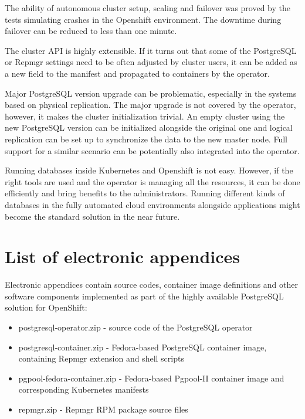 \documentclass[
  digital, %
  twoside, %
  table,   %
  lof,     %
  lot,     %
]{fithesis3}
\begin{document}
The ability of autonomous cluster setup, scaling and failover was proved by the tests simulating crashes in the Openshift environment. The downtime during failover can be reduced to less than one minute.

The cluster API is highly extensible. If it turns out that some of the PostgreSQL or Repmgr settings need to be often adjusted by cluster users, it can be added as a new field to the manifest and propagated to containers by the operator.

Major PostgreSQL version upgrade can be problematic, especially in the systems based on physical replication. The major upgrade is not covered by the operator, however, it makes the cluster initialization trivial. An empty cluster using the new PostgreSQL version can be initialized alongside the original one and logical replication can be set up to synchronize the data to the new master node. Full support for a similar scenario can be potentially also integrated into the operator.

Running databases inside Kubernetes and Openshift is not easy. However, if the right tools are used and the operator is managing all the resources, it can be done efficiently and bring benefits to the administrators. Running different kinds of databases in the fully automated cloud environments alongside applications might become the standard solution in the near future.


\appendix %
\chapter{List of electronic appendices} \label{chap:appendices}
Electronic appendices contain source codes, container image definitions and other software components implemented as part of the highly available PostgreSQL solution for OpenShift:
\begin{itemize}
  \item postgresql-operator.zip - source code of the PostgreSQL operator
  \item postgresql-container.zip - Fedora-based PostgreSQL container image, containing Repmgr extension and shell scripts
  \item pgpool-fedora-container.zip - Fedora-based Pgpool-II container image and corresponding Kubernetes manifests
  \item repmgr.zip - Repmgr RPM package source files
\end{itemize}
\end{document}

